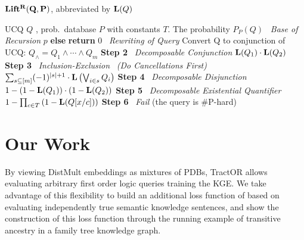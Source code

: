 \documentclass{article}
\begin{document}
\begin{algorithm}[tb]
\caption{$\bf Lift^R(Q,P)$, abbreviated by ${\bf L}(Q)$ \label{alg:LiftR}}
  \begin{algorithmic}[1]
    \Require UCQ $Q$ , prob.~database $P$ with constants $T$.
    \Ensure The probability $P_{P}(Q)$
      ~\emph{Base of Recursion}
    \Indent
     \Return $p$ \textbf{else} \textbf{return} $0$
    \EndIf
    \EndIf
    \EndIndent
     ~\emph{Rewriting of Query}
    \Indent
    \State Convert Q to conjunction of UCQ: 
        $Q_{\land}\!\!=\!Q_1   \land  \cdots  \land Q_m$
    \EndIndent
    \State \textbf{Step 2}  ~\emph{Decomposable Conjunction}
    \Indent
         \State  \Return ${\bf L}(Q_1) \cdot {\bf L}(Q_2)$
    \EndIf
    \EndIndent
    \State \textbf{Step 3}  ~\emph{Inclusion-Exclusion}
    \Indent
    \State ~\emph{(Do Cancellations First)}
         \State \Return $\sum_{s \subseteq [m]}(-1)^{|s|+1} \cdot {\bf L}\left(\bigvee_{i \in s} Q_i\right)$
          \EndIf
     \EndIndent
    \State \textbf{Step 4}  ~\emph{Decomposable Disjunction}
    \Indent
     \State \Return $1- \left(1-{\bf L}(Q_1)\right) \cdot \left(1-{\bf L}(Q_2)\right)$
    \EndIf
     \EndIndent
    \State \textbf{Step 5}  ~\emph{Decomposable Existential Quantifier}
    \Indent
     \State \Return $1-\prod_{c \in T} \left(1-{\bf L}(Q[x/c])\right)$ \label{line:separator}
    \EndIf
     \EndIndent
    \State \textbf{Step 6}  ~\emph{Fail}  (the query is \#P-hard)
  \end{algorithmic}
\end{algorithm}

\section{Our Work}

By viewing DistMult embeddings as mixtures of PDBs, TractOR allows evaluating
arbitrary first order logic queries training the KGE.  We take advantage of this
flexibility to build an additional loss function of based on evaluating
independently true semantic knowledge sentences, and show the construction of
this loss function through the running example of transitive ancestry in a
family tree knowledge graph.
\end{document}
